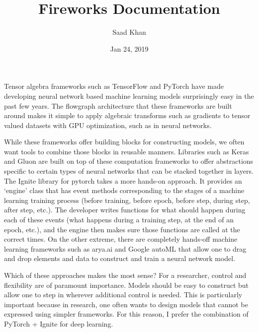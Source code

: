 \documentclass[letterpaper,10pt,english]{sphinxmanual}
\title{Fireworks Documentation}
\date{Jan 24, 2019}
\author{Saad Khan}
\begin{document}
\pagestyle{empty}
\maketitle
\pagestyle{plain}
\sphinxtableofcontents
\pagestyle{normal}
\label{\detokenize{index::doc}}



Tensor algebra frameworks such as TensorFlow and PyTorch have made developing neural network based machine learning models surprisingly easy in the past few years. The flowgraph architecture that these frameworks are built around makes it simple to apply algebraic transforms such as gradients to tensor valued datasets with GPU optimization, such as in neural networks.

While these frameworks offer building blocks for constructing models, we often want tools to combine those blocks in reusable manners. Libraries such as Keras and Gluon are built on top of these computation frameworks to offer abstractions specific to certain types of neural networks that can be stacked together in layers. The Ignite library for pytorch takes a more hands-on approach. It provides an ‘engine’ class that has event methods corresponding to the stages of a machine learning training process (before training, before epoch, before step, during step, after step, etc.). The developer writes functions for what should happen during each of these events (what happens during a training step, at the end of an epoch, etc.), and the engine then makes sure those functions are called at the correct times. On the other extreme, there are completely hands-off machine learning frameworks such as arya.ai and Google autoML that allow one to drag and drop elements and data to construct and train a neural network model.

Which of these approaches makes the most sense? For a researcher, control and flexibility are of paramount importance. Models should be easy to construct but allow one to step in wherever additional control is needed. This is particularly important because in research, one often wants to design models that cannot be expressed using simpler frameworks. For this reason, I prefer the combination of PyTorch + Ignite for deep learning.
\end{document}
